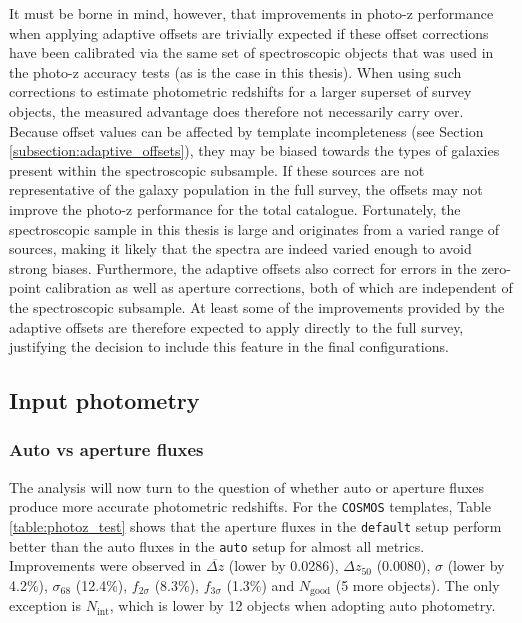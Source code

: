 It must be borne in mind, however, that improvements in photo-z performance when applying adaptive offsets are trivially expected if these offset corrections have been calibrated via the same set of spectroscopic objects that was used in the photo-z accuracy tests (as is the case in this thesis). When using such corrections to estimate photometric redshifts for a larger superset of survey objects, the measured advantage does therefore not necessarily carry over. Because offset values can be affected by template incompleteness (see Section \ref{subsection:adaptive_offsets}), they may be biased towards the types of galaxies present within the spectroscopic subsample. If these sources are not representative of the galaxy population in the full survey, the offsets may not improve the photo-z performance for the total \DESVIDEO catalogue. Fortunately, the spectroscopic sample in this thesis is large and originates from a varied range of sources, making it likely that the spectra are indeed varied enough to avoid strong biases. Furthermore, the adaptive offsets also correct for errors in the zero-point calibration as well as aperture corrections, both of which are independent of the spectroscopic subsample. At least some of the improvements provided by the adaptive offsets are therefore expected to apply directly to the full survey, justifying the decision to include this feature in the final configurations. \par



\subsection{Input photometry}
\subsubsection{Auto vs aperture fluxes}\label{subsubsection:auto_magnitudes}
The analysis will now turn to the question of whether auto or aperture fluxes produce more accurate photometric redshifts. For the \texttt{COSMOS} templates, Table \ref{table:photoz_test} shows that the aperture fluxes in the \texttt{default} setup perform better than the auto fluxes in the \texttt{auto} setup for almost all metrics. Improvements were observed in $\overbar{\Delta z}$ (lower by 0.0286), $\Delta z_{50}$ (0.0080), $\sigma$ (lower by 4.2\%), $\sigma_{68}$ (12.4\%), $f_{2\sigma}$ (8.3\%), $f_{3\sigma}$ (1.3\%) and $N_{\mathrm{good}}$ (5 more objects). The only exception is $N_{\mathrm{int}}$, which is lower by 12 objects when adopting auto photometry. \par


